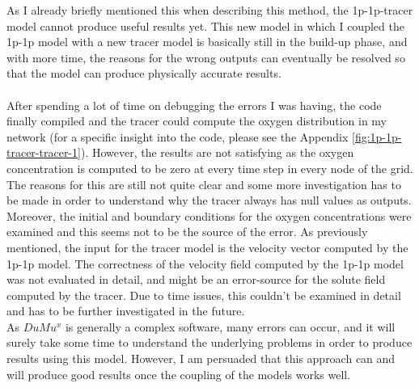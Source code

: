 As I already briefly mentioned this when describing this method, the 1p-1p-tracer model cannot produce useful results yet. This new model in which I coupled the 1p-1p model with a new tracer model is basically still in the build-up phase, and with more time, the reasons for the wrong outputs can eventually be resolved so that the model can produce physically accurate results.\\
\\After spending a lot of time on debugging the errors I was having, the code finally compiled and the tracer could compute the oxygen distribution in my network (for a specific insight into the code, please see the Appendix \ref{fig:1p-1p-tracer-tracer-1}). However, the results are not satisfying as the oxygen concentration is computed to be zero at every time step in every node of the grid. The reasons for this are still not quite clear and some more investigation has to be made in order to understand why the tracer always has null values as outputs. Moreover, the initial and boundary conditions for the oxygen concentrations were examined and this seems not to be the source of the error.
\newpage
As previously mentioned, the input for the tracer model is the velocity vector computed by the 1p-1p model. The correctness of the velocity field computed by the 1p-1p model was not evaluated in detail, and might be an error-source for the solute field computed by the tracer. Due to time issues, this couldn't be examined in detail and has to be further investigated in the future.
\\As $DuMu^x$ is generally a complex software, many errors can occur, and it will surely take some time to understand the underlying problems in order to produce results using this model. However, I am persuaded that this approach can and will produce good results once the coupling of the models works well.

\newpage
